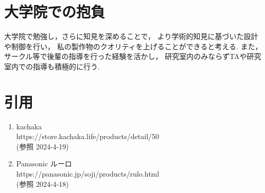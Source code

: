 \documentclass[dvipdfmx]{jsarticle}
\begin{document}
\section{大学院での抱負}
大学院で勉強し，さらに知見を深めることで，
より学術的知見に基づいた設計や制御を行い，
私の製作物のクオリティを上げることができると考える.
また，サークル等で後輩の指導を行った経験を活かし，
研究室内のみならずTAや研究室内での指導も積極的に行う.
\section{引用}
\begin{enumerate}
\renewcommand{\labelenumi}{[\arabic{enumi}]}
  \item kachaka\\
        https://store.kachaka.life/products/detail/50\\
        (参照 2024-4-19)
  \item Panasonic ルーロ\\
        https://panasonic.jp/soji/products/rulo.html\\
        (参照 2024-4-18)
  \end{enumerate}
\end{document}
